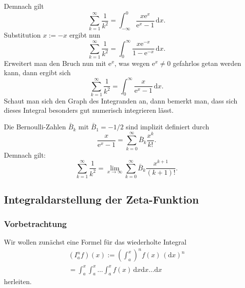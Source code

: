 \documentclass[a4paper,10pt,fleqn,twocolumn,twoside]{scrartcl}
\numberwithin{equation}{section}
\newcommand{\ee}{\mathrm e}
\theoremstyle{rmbox}
\begin{document}
Demnach gilt
\begin{equation}
\sum_{k=1}^\infty\frac{1}{k^2}
= \int_{-\infty}^0 \frac{x\ee^x}{\ee^x-1}\,\mathrm dx.
\end{equation}
Substitution $x:=-x$ ergibt nun
\begin{equation}
\sum_{k=1}^\infty\frac{1}{k^2}
= \int_0^\infty \frac{x\ee^{-x}}{1-\ee^{-x}}\,\mathrm dx.
\end{equation}
Erweitert man den Bruch nun mit $\ee^x$, was wegen $\ee^x\ne 0$
gefahrlos getan werden kann, dann ergibt sich%
\begin{equation}
\sum_{k=1}^\infty\frac{1}{k^2}
= \int_0^\infty \frac{x}{\ee^x-1}\,\mathrm dx.
\end{equation}
Schaut man sich den Graph des Integranden an, dann bemerkt man,
dass sich dieses Integral besonders gut numerisch integrieren
lässt.

Die Bernoulli-Zahlen $\bar B_k$ mit $\bar B_1=-1/2$
sind implizit definiert durch%
\begin{equation}
\frac{x}{\ee^x-1} = \sum_{k=0}^\infty \bar B_k\frac{x^k}{k!}.
\end{equation}
Demnach gilt:
\begin{equation}
\sum_{k=1}^\infty\frac{1}{k^2}
= \lim_{x\to\infty}\sum_{k=0}^\infty \bar B_k\frac{x^{k+1}}{(k+1)!}.
\end{equation}

\subsection{Integraldarstellung der Zeta-Funktion}

\subsubsection{Vorbetrachtung}
Wir wollen zunächst eine Formel für das wiederholte Integral
\begin{gather}
(I_a^n f)(x) := \left(\int_a^x\right)^n f(x)\,(\mathrm dx)^n\\
= \int_a^x\int_a^x\ldots\int_a^x f(x)\,\mathrm dx\mathrm dx\ldots\mathrm dx
\end{gather}
herleiten.
\end{document}

